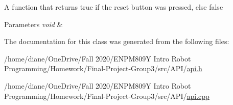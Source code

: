 A function that returns true if the reset button was pressed, else false 
\begin{DoxyParams}{Parameters}
{\em void} & \\
\hline
\end{DoxyParams}


The documentation for this class was generated from the following files\+:\begin{DoxyCompactItemize}
\item 
/home/diane/\+One\+Drive/\+Fall 2020/\+E\+N\+P\+M809\+Y Intro Robot Programming/\+Homework/\+Final-\/\+Project-\/\+Group3/src/\+A\+P\+I/\hyperlink{api_8h}{api.\+h}\item 
/home/diane/\+One\+Drive/\+Fall 2020/\+E\+N\+P\+M809\+Y Intro Robot Programming/\+Homework/\+Final-\/\+Project-\/\+Group3/src/\+A\+P\+I/\hyperlink{api_8cpp}{api.\+cpp}\end{DoxyCompactItemize}
